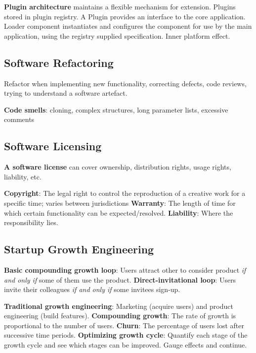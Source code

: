 \documentclass{article}
\begin{document}
\noindent \textbf{Plugin architecture} maintains a flexible mechanism for extension.
Plugins stored in plugin registry.
A Plugin provides an interface to the core application.
Loader component instantiates and configures the component for use by the main application, using the registry supplied specification.
Inner platform effect.


\subsection*{Software Refactoring}

Refactor when implementing new functionality, correcting defects, code reviews, trying to understand a software artefact.

\noindent \textbf{Code smells}: cloning, complex structures, long parameter lists, excessive comments


\subsection*{Software Licensing}

\noindent \textbf{A software license} can cover ownership, distribution rights, usage rights, liability, etc.

\noindent \textbf{Copyright}: The legal right to control the reproduction of a creative work for a specific time; varies between jurisdictions
\noindent \textbf{Warranty}: The length of time for which certain functionality can be expected/resolved.
\noindent \textbf{Liability}: Where the responsibility lies.


\subsection*{Startup Growth Engineering}

\noindent \textbf{Basic compounding growth loop}: Users attract other to consider product \textit{if and only if} some of them use the product.
\noindent \textbf{Direct-invitational loop}: Users invite their colleagues \textit{if and only if} some invitees sign-up.

\noindent \textbf{Traditional growth engineering}: Marketing (acquire users) and product engineering (build features).
\noindent \textbf{Compounding growth}: The rate of growth is proportional to the number of users.
\noindent \textbf{Churn}: The percentage of users lost after successive time periods.
\noindent \textbf{Optimizing growth cycle}: Quantify each stage of the growth cycle and see which stages can be improved. Gauge effects and continue.
\end{document}
